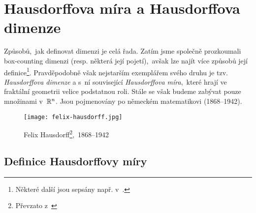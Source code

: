 \section{Hausdorffova míra a Hausdorffova dimenze}\label{sec:hausdorffova-mira-dimenze}

Způsobů,~jak definovat dimenzi je celá řada. Zatím jsme společně prozkoumali box-counting dimenzi (resp. některá její pojetí),~avšak lze najít více způsobů její definice\footnote{Některé další jsou sepsány např. v~\citep[str. 40]{Falconer2014}.}. Pravděpodobně však nejstarším exemplářem svého druhu je tzv. \emph{Hausdorffova dimenze} a s~ní související \emph{Hausdorffova míra},~které hrají ve fraktální geometrii velice podstatnou roli. Stále se však budeme zabývat pouze množinami v~$\mathbb{R}^n$. Jsou pojmenovány po německém matematikovi  (1868--1942).
\begin{figure}[h]
    \centering
    \texttt{[image: felix-hausdorff.jpg]}
    \caption[Felix Hausdorff,~1868--1942]{Felix Hausdorff\footnote{Převzato z~\cite{OConnorHausdorff2025}},~1868--1942}
    \label{fig:felix-hausdorff}
\end{figure}

\subsection{Definice Hausdorffovy míry}\label{subsec:hd-mira-definice}

